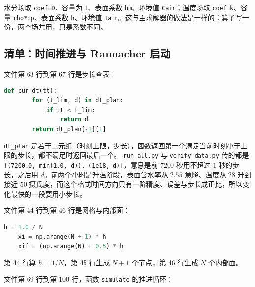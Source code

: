 水分场取 \texttt{coef=D}、容量为 $1$、表面系数 \texttt{hm}、环境值 \texttt{Cair}；温度场取 \texttt{coef=k}、容量 \texttt{rho*cp}、表面系数 \texttt{h}、环境值 \texttt{Tair}。这与主求解器的做法是一样的：算子写一份，两个场共用，只是系数不同。

\subsection{清单：时间推进与 Rannacher 启动}

文件第 63 行到第 67 行是步长查表：

\begin{lstlisting}[language=Python]
    def cur_dt(tt):
        for (t_lim, d) in dt_plan:
            if tt < t_lim:
                return d
        return dt_plan[-1][1]
\end{lstlisting}

\texttt{dt\_plan} 是若干二元组（时刻上限，步长），函数返回第一个满足当前时刻小于上限的步长，都不满足时返回最后一个。
\texttt{run\_all.py} 与 \texttt{verify\_data.py} 传的都是 \texttt{[(7200.0, min(1.0, d)), (1e18, d)]}，意思是前 $7200$ 秒用不超过 $1$ 秒的步长，之后用 $d$。前两个小时是升温阶段，表面含水率从 $2.55$ 急降、温度从 $28$ 升到接近 $50$ 摄氏度，而这个格式时间方向只有一阶精度、误差与步长成正比，所以变化最快的一段要用小步长。

文件第 44 行到第 46 行是网格与内部面：

\begin{lstlisting}[language=Python]
    h = 1.0 / N
    xi = np.arange(N + 1) * h
    xif = (np.arange(N) + 0.5) * h
\end{lstlisting}

第 44 行算 $h=1/N$，第 45 行生成 $N+1$ 个节点，第 46 行生成 $N$ 个内部面。

文件第 69 行到第 100 行，函数 \texttt{simulate} 的推进循环：

